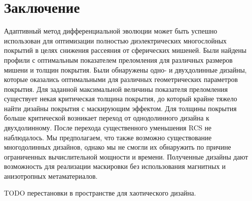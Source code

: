 \section{Заключение}

Адаптивный метод дифференциальной эволюции может быть успешно
использован для оптимизации полностью диэлектрических многослойных
покрытий в целях снижения рассеяния от сферических мишеней.  Были
найдены профили с оптимальным показателем преломления для различных
размеров мишени и толщин покрытия.  Были обнаружены одно- и
двухдолинные дизайны, которые оказались оптимальными для различных
геометрических параметров покрытия.  Для заданной максимальной
величины показателя преломления существует некая критическая толщина
покрытия, до который крайне тяжело найти дизайны покрытия с
маскирующим эффектом.  Для толщины покрытия больше критической
возникает переход от однодолинного дизайна к двухдолинному.  После
перехода существенного уменьшения RCS не наблюдалось.  Мы
предполагаем, что также возможно существование многодолинных дизайнов,
однако мы не смогли их обнаружить по причине ограниченных
вычислительной мощности и времени.  Полученные дизайны дают
возможность для реализации маскировки без использования магнитных и
анизотропных метаматериалов.
   


TODO перестановки в пространстве для хаотического дизайна.

